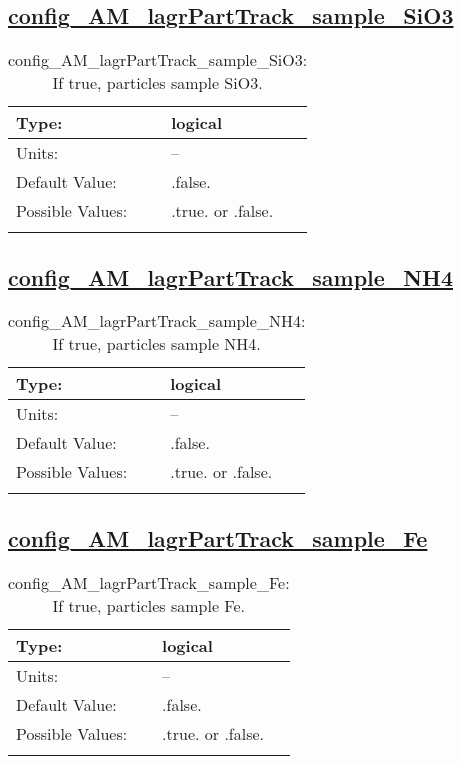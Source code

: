 \subsection[config\_AM\_lagrPartTrack\_sample\_SiO3]{\hyperref[sec:nm_tab_AM_lagrPartTrack]{config\_AM\_lagrPartTrack\_sample\_SiO3}}
\label{subsec:nm_sec_config_AM_lagrPartTrack_sample_SiO3}
\begin{center}
\begin{longtable}{| p{2.0in} || p{4.0in} |}
    \hline
    Type: & logical \\
    \hline
    Units: & -- \\
    \hline
    Default Value: & .false. \\
    \hline
    Possible Values: & .true. or .false. \\
    \hline
    \caption{config\_AM\_lagrPartTrack\_sample\_SiO3: If true, particles sample SiO3.}
\end{longtable}
\end{center}
\subsection[config\_AM\_lagrPartTrack\_sample\_NH4]{\hyperref[sec:nm_tab_AM_lagrPartTrack]{config\_AM\_lagrPartTrack\_sample\_NH4}}
\label{subsec:nm_sec_config_AM_lagrPartTrack_sample_NH4}
\begin{center}
\begin{longtable}{| p{2.0in} || p{4.0in} |}
    \hline
    Type: & logical \\
    \hline
    Units: & -- \\
    \hline
    Default Value: & .false. \\
    \hline
    Possible Values: & .true. or .false. \\
    \hline
    \caption{config\_AM\_lagrPartTrack\_sample\_NH4: If true, particles sample NH4.}
\end{longtable}
\end{center}
\subsection[config\_AM\_lagrPartTrack\_sample\_Fe]{\hyperref[sec:nm_tab_AM_lagrPartTrack]{config\_AM\_lagrPartTrack\_sample\_Fe}}
\label{subsec:nm_sec_config_AM_lagrPartTrack_sample_Fe}
\begin{center}
\begin{longtable}{| p{2.0in} || p{4.0in} |}
    \hline
    Type: & logical \\
    \hline
    Units: & -- \\
    \hline
    Default Value: & .false. \\
    \hline
    Possible Values: & .true. or .false. \\
    \hline
    \caption{config\_AM\_lagrPartTrack\_sample\_Fe: If true, particles sample Fe.}
\end{longtable}
\end{center}
